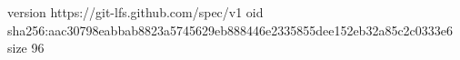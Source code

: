 version https://git-lfs.github.com/spec/v1
oid sha256:aac30798eabbab8823a5745629eb888446e2335855dee152eb32a85c2c0333e6
size 96
